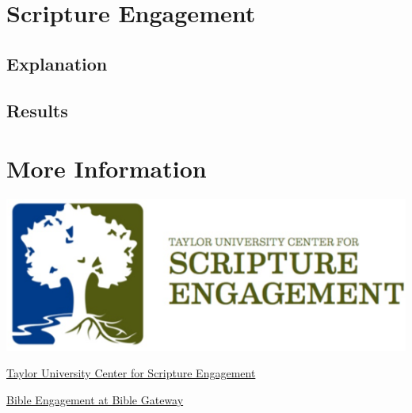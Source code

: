 \documentclass{article}
\begin{document}
\section*{Scripture Engagement}
\lipsum[5]
\subsection*{Explanation}
\lipsum[6-7]
\subsection*{Results}
\lipsum[8]

\section*{More Information}
\lipsum[2]
\begin{center}
  \vspace{0.25in}
  \href{http://tucse.taylor.edu/}{\includegraphics{c4se-logo}}

  \vspace{0.25in}
  \href{http://tucse.taylor.edu/}{Taylor University Center for Scripture Engagement}

  \vspace{0.25in}
  \href{https://www.biblegateway.com/resources/scripture-engagement/}{Bible Engagement at Bible Gateway }
\end{center}
\end{document}
